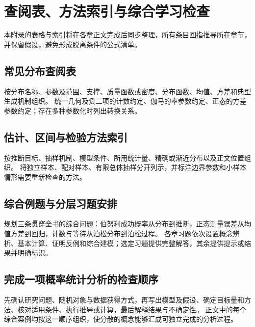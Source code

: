 \setcounter{chapter}{1} %
\chapter{查阅表、方法索引与综合学习检查}
\label{app:ps-reference}

本附录的表格与索引将在各章正文完成后同步整理，所有条目回指推导所在章节，并保留假设，避免形成脱离条件的公式清单。

\section{常见分布查阅表}
按分布名称、参数及范围、支撑、质量函数或密度、分布函数、均值、方差和典型生成机制组织。
统一几何及负二项的计数约定、伽马的率参数约定、正态的方差参数约定；存在多种参数化时列出转换关系。

\section{估计、区间与检验方法索引}
按推断目标、抽样机制、模型条件、所用统计量、精确或渐近分布以及正文位置组织。
将独立样本、配对样本、有限总体抽样分开列示，并标注边界参数和小样本情形需要重新检查的方法。

\section{综合例题与分层习题安排}
规划三条贯穿全书的综合问题：伯努利成功概率从分布到推断，正态测量误差从均值方差到回归，计数与等待从泊松分布到泊松过程。
各章习题依次设置概念辨析、基本计算、证明反例和综合建模；选定习题提供完整解答，其余提供提示或结果并明确标识。

\section{完成一项概率统计分析的检查顺序}
先确认研究问题、随机对象与数据获得方式，再写出模型及假设、确定目标量和方法、核对适用条件、执行推导或计算，最后解释结果与不确定性。
正文中的每个综合案例均按这一顺序组织，使分散的概念能够汇成可独立完成的分析过程。




